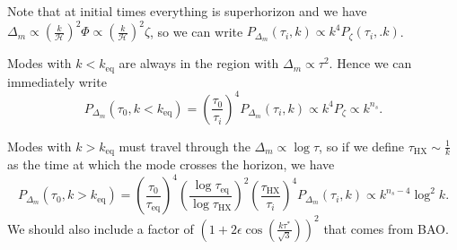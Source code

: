 \documentclass{jknotes}
\begin{document}
Note that at initial times everything is superhorizon and we have \(\Delta_m \propto \left(\frac{k}{\mathcal{H}}\right)^2\Phi\propto\left(\frac{k}{\mathcal{H}}\right)^2\zeta\), so we can write \(P_{\Delta_m}(\tau_i,k)\propto k^4P_\zeta(\tau_i,.k)\).

Modes with \(k<k_{\text{eq}}\) are always in the region with \(\Delta_m \propto \tau^2\). Hence we can immediately write
\begin{equation}
    P_{\Delta_m}(\tau_0,k<k_{\text{eq}}) = \left(\frac{\tau_0}{\tau_i}\right)^4P_{\Delta_m}(\tau_i,k) \propto k^4P_\zeta \propto k^{n_s}.
\end{equation}

Modes with \(k>k_{\text{eq}}\) must travel through the \(\Delta_m \propto \log \tau\), so if we define \(\tau_{\text{HX}} \sim \frac1k\) as the time at which the mode crosses the horizon, we have
\begin{equation}
    P_{\Delta_m}(\tau_0,k>k_{\text{eq}}) = \left(\frac{\tau_0}{\tau_{\text{eq}}}\right)^4 \left(\frac{\log \tau_{\text{eq}}}{\log\tau_{\text{HX}}}\right)^2\left(\frac{\tau_{\text{HX}}}{\tau_i}\right)^4P_{\Delta_m}(\tau_i,k) \propto k^{n_s-4}\log^2k .
\end{equation}
We should also include a factor of \(\left(1+2\epsilon\cos(\frac{k\tau^*}{\sqrt3})\right)^2\) that comes from BAO. 
\end{document}
